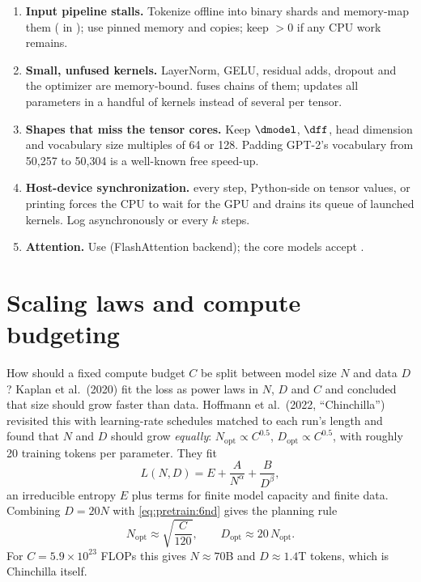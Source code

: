 \begin{systemslens}
\begin{enumerate}
\item \textbf{Input pipeline stalls.} Tokenize offline into binary shards and memory-map them
  ( in ); use pinned memory and
   copies; keep $>0$ if any CPU work remains.
\item \textbf{Small, unfused kernels.} LayerNorm, GELU, residual adds, dropout and the optimizer
  are memory-bound.  fuses chains of them;  updates
  all parameters in a handful of kernels instead of several per tensor.
\item \textbf{Shapes that miss the tensor cores.} Keep $\dmodel$, $\dff$, head dimension and
  vocabulary size multiples of 64 or 128. Padding GPT-2's vocabulary from 50{,}257 to 50{,}304
  is a well-known free speed-up.
\item \textbf{Host-device synchronization.}  every step, Python-side
   on tensor values, or printing forces the CPU to wait for the GPU and drains its
  queue of launched kernels. Log asynchronously or every $k$ steps.
\item \textbf{Attention.} Use  (FlashAttention backend);
  the core models accept .
\end{enumerate}
\end{systemslens}

\section{Scaling laws and compute budgeting}\label{sec:pretrain:scaling}

How should a fixed compute budget $C$ be split between model size $N$ and data $D$? Kaplan et
al.\ (2020) fit the loss as power laws in $N$, $D$ and $C$ and concluded that size should grow
faster than data. Hoffmann et al.\ (2022, ``Chinchilla'') revisited this with learning-rate
schedules matched to each run's length and found that $N$ and $D$ should grow \emph{equally}:
$N_{\text{opt}}\propto C^{0.5}$, $D_{\text{opt}}\propto C^{0.5}$, with roughly 20 training
tokens per parameter. They fit
\begin{equation}
L(N,D) = E + \frac{A}{N^{\alpha}} + \frac{B}{D^{\beta}},
\end{equation}
an irreducible entropy $E$ plus terms for finite model capacity and finite data. Combining
$D=20N$ with \cref{eq:pretrain:6nd} gives the planning rule
\begin{equation}
N_{\text{opt}} \approx \sqrt{\frac{C}{120}}, \qquad D_{\text{opt}}\approx 20\,N_{\text{opt}}.
\end{equation}
For $C=5.9\times10^{23}$ FLOPs this gives $N\approx70$B and $D\approx1.4$T tokens, which is
Chinchilla itself.

